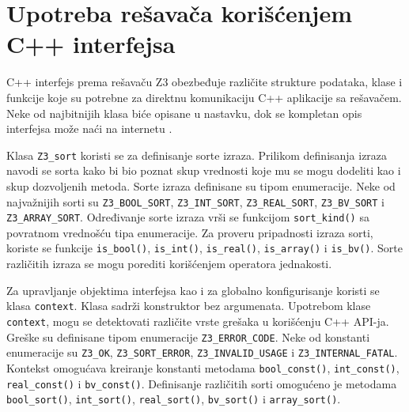 \documentclass[12pt,oneside]{memoir}
\begin{document}
\section{Upotreba rešavača korišćenjem C++ interfejsa} \label{sec:num5}
C++ interfejs prema rešavaču Z3 obezbeđuje različite strukture podataka, klase i funkcije koje su potrebne za direktnu komunikaciju C++ aplikacije sa rešavačem. Neke od najbitnijih klasa biće opisane u nastavku, dok se kompletan opis interfejsa može naći na internetu \cite{cppapi}.

Klasa \texttt{Z3\_sort} koristi se za definisanje sorte izraza.  Prilikom definisanja izraza navodi se sorta kako bi bio poznat skup vrednosti koje mu se mogu dodeliti kao i skup dozvoljenih metoda. Sorte izraza definisane su tipom enumeracije. Neke od najvažnijih sorti su \texttt{Z3\_BOOL\_SORT}, \texttt{Z3\_INT\_SORT}, \texttt{Z3\_REAL\_SORT}, \texttt{Z3\_BV\_SORT} i \texttt{Z3\_ARRAY\_SORT}. Određivanje sorte izraza vrši se funkcijom \texttt{sort\_kind()} sa povratnom vrednošću tipa enumeracije. Za proveru pripadnosti izraza sorti, koriste se funkcije \texttt{is\_bool()}, \texttt{is\_int()}, \texttt{is\_real()}, \texttt{is\_array()} i \texttt{is\_bv()}. Sorte različitih izraza se mogu porediti korišćenjem operatora jednakosti. \par 

Za upravljanje objektima interfejsa kao i za globalno konfigurisanje koristi se klasa \texttt{context}. Klasa sadrži konstruktor bez argumenata. Upotrebom klase \texttt{context}, mogu se detektovati različite vrste grešaka u korišćenju C++ API-ja. Greške su definisane tipom enumeracije \texttt{Z3\_ERROR\_CODE}. Neke od konstanti enumeracije su \texttt{Z3\_OK}, \texttt{Z3\_SORT\_ERROR}, \texttt{Z3\_INVALID\_USAGE} i \texttt{Z3\_INTERNAL\_FATAL}.  Kontekst omogućava kreiranje konstanti metodama \texttt{bool\_const()}, \texttt{int\_const()}, \texttt{real\_const()} i \texttt{bv\_const()}. Definisanje različitih sorti omogućeno je metodama \texttt{bool\_sort()}, \texttt{int\_sort()}, \texttt{real\_sort()}, \texttt{bv\_sort()} i \texttt{array\_sort()}. 
\par
\end{document}
